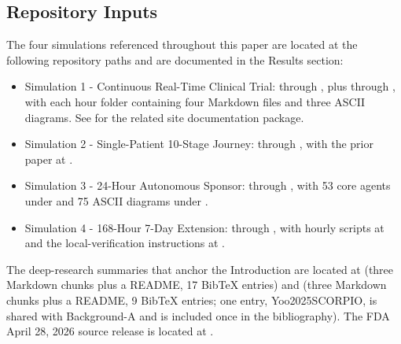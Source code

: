 \subsection{Repository Inputs}
\label{sec:methods-inputs}

The four simulations referenced throughout this paper are located at the
following repository paths and are documented in the Results section:

\begin{itemize}[leftmargin=*]
\item Simulation 1 - Continuous Real-Time Clinical Trial:
 through
, plus
 through
, with each hour folder containing four Markdown files and
three ASCII diagrams. See \cite{kawchak_2026_19176370} for the related
site documentation package.
\item Simulation 2 - Single-Patient 10-Stage Journey:
 through
, with the prior paper at
\cite{kawchak_2026_19119939}.
\item Simulation 3 - 24-Hour Autonomous Sponsor:
 through
, with 53 core agents under
 and 75 ASCII diagrams under
 \cite{kawchak_2026_19396256}.
\item Simulation 4 - 168-Hour 7-Day Extension:
 through
, with hourly scripts at
 and the local-verification
instructions at
\cite{kawchak_2026_19396256}.
\end{itemize}

The deep-research summaries that anchor the Introduction are located at
 (three Markdown chunks
plus a README, 17 BibTeX entries) and
 (three Markdown chunks
plus a README, 9 BibTeX entries; one entry, Yoo2025SCORPIO, is shared with
Background-A and is included once in the bibliography). The FDA April 28,
2026 source release is located at
\cite{fda2026realtime}.

